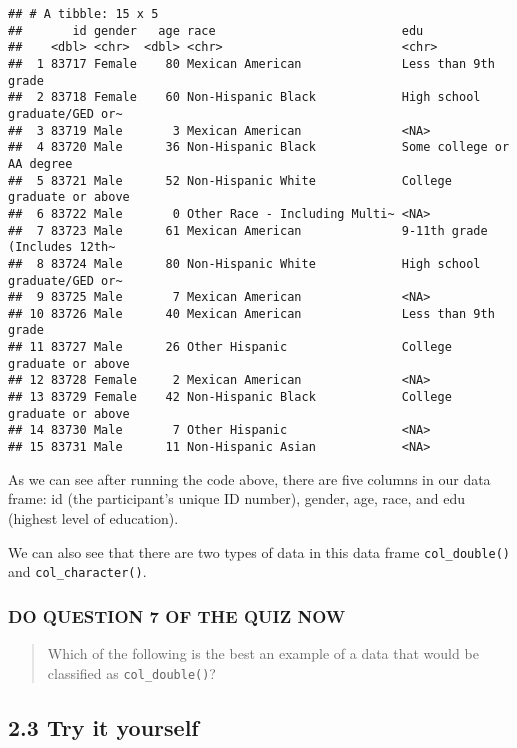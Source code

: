 \documentclass[
]{book}
\begin{document}
\begin{verbatim}
## # A tibble: 15 x 5
##       id gender   age race                          edu                         
##    <dbl> <chr>  <dbl> <chr>                         <chr>                       
##  1 83717 Female    80 Mexican American              Less than 9th grade         
##  2 83718 Female    60 Non-Hispanic Black            High school graduate/GED or~
##  3 83719 Male       3 Mexican American              <NA>                        
##  4 83720 Male      36 Non-Hispanic Black            Some college or AA degree   
##  5 83721 Male      52 Non-Hispanic White            College graduate or above   
##  6 83722 Male       0 Other Race - Including Multi~ <NA>                        
##  7 83723 Male      61 Mexican American              9-11th grade (Includes 12th~
##  8 83724 Male      80 Non-Hispanic White            High school graduate/GED or~
##  9 83725 Male       7 Mexican American              <NA>                        
## 10 83726 Male      40 Mexican American              Less than 9th grade         
## 11 83727 Male      26 Other Hispanic                College graduate or above   
## 12 83728 Female     2 Mexican American              <NA>                        
## 13 83729 Female    42 Non-Hispanic Black            College graduate or above   
## 14 83730 Male       7 Other Hispanic                <NA>                        
## 15 83731 Male      11 Non-Hispanic Asian            <NA>
\end{verbatim}

As we can see after running the code above, there are five columns in our data frame: id (the participant's unique ID number), gender, age, race, and edu (highest level of education).

We can also see that there are two types of data in this data frame \texttt{col\_double()} and \texttt{col\_character()}.

\hypertarget{do-question-7-of-the-quiz-now}{%
\subsubsection{DO QUESTION 7 OF THE QUIZ NOW}\label{do-question-7-of-the-quiz-now}}

\begin{quote}
Which of the following is the best an example of a data that would be classified as \texttt{col\_double()}?
\end{quote}

\hypertarget{try-it-yourself-11}{%
\subsection{2.3 Try it yourself}\label{try-it-yourself-11}}
\end{document}
